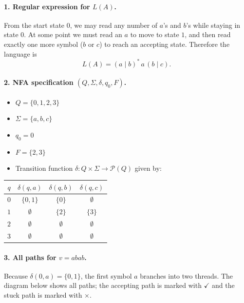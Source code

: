 \documentclass[11pt, a4paper]{article}
\theoremstyle{definition}
\theoremstyle{remark}
\begin{document}
\paragraph{1. Regular expression for $L(A)$.}
From the start state $0$, we may read any number of $a$'s and $b$'s while staying in state $0$.
At some point we must read an $a$ to move to state $1$, and then read exactly one more symbol ($b$ or $c$) to reach an accepting state.
Therefore the language is
\[
L(A) = (a\mid b)^*\,a\,(b\mid c).
\]

\paragraph{2. NFA specification $(Q,\Sigma,\delta,q_0,F)$.}
\begin{itemize}
  \item $Q=\{0,1,2,3\}$
  \item $\Sigma=\{a,b,c\}$
  \item $q_0=0$
  \item $F=\{2,3\}$
  \item Transition function $\delta:Q\times\Sigma\to\mathcal{P}(Q)$ given by:
\end{itemize}

\begin{center}
\begin{tabular}{c|c|c|c}
$q$ & $\delta(q,a)$ & $\delta(q,b)$ & $\delta(q,c)$ \\ \hline
$0$ & $\{0,1\}$ & $\{0\}$ & $\emptyset$ \\
$1$ & $\emptyset$ & $\{2\}$ & $\{3\}$ \\
$2$ & $\emptyset$ & $\emptyset$ & $\emptyset$ \\
$3$ & $\emptyset$ & $\emptyset$ & $\emptyset$ \\
\end{tabular}
\end{center}

\paragraph{3. All paths for $v=abab$.}
Because $\delta(0,a)=\{0,1\}$, the first symbol $a$ branches into two threads.
The diagram below shows all paths; the accepting path is marked with $\checkmark$ and the stuck path is marked with $\times$.
\end{document}
